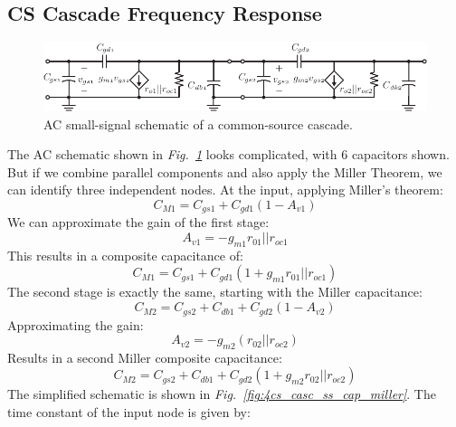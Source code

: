 \subsection{CS Cascade Frequency Response}
\begin{figure}[tb]
\centering
\includegraphics[scale=1]{3cs_casc_ss_cap}
\caption{AC small-signal schematic of a common-source cascade.}
\label{fig:3cs_casc_ss_cap}
\end{figure}
The AC schematic shown in \emph{Fig.~\ref{fig:3cs_casc_ss_cap}} looks complicated, with 6 capacitors shown.  But if we combine parallel components and also apply the Miller Theorem, we can identify three independent nodes.  At the input, applying Miller's theorem:
    \begin{equation} 
        C_{M1} = C_{gs1} + C_{gd1} (1 - A_{v1}) 
    \end{equation}
We can approximate the gain of the first stage:
    \begin{equation} 
        A_{v1} = -g_{m1} r_{01}||r_{oc1} 
    \end{equation}
This results in a composite capacitance of:
    \begin{equation} 
        C_{M1} = C_{gs1} + C_{gd1} (1 + g_{m1} r_{01}||r_{oc1}) 
    \end{equation}
The second stage is exactly the same, starting with the Miller capacitance:
    \begin{equation} 
        C_{M2} = C_{gs2} + C_{db1} + C_{gd2} (1 - A_{v2}) 
    \end{equation}
Approximating the gain:
    \begin{equation} 
        A_{v2} = -g_{m2} (r_{02}||r_{oc2})
    \end{equation}
Results in a second Miller composite capacitance:
    \begin{equation} 
        C_{M2} = C_{gs2} + C_{db1} + C_{gd2} (1 + g_{m2} r_{02}||r_{oc2}) 
    \end{equation}
The simplified schematic is shown in \emph{Fig.~\ref{fig:4cs_casc_ss_cap_miller}}.  The time constant of the input node is given by:
